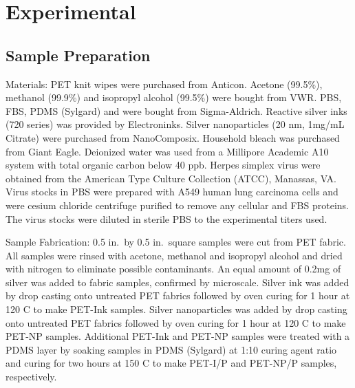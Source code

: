 \documentclass[journal=jacsat,manuscript=article]{achemso}
\begin{document}

\section{Experimental}


\subsection{Sample Preparation}
Materials: PET knit wipes were purchased from Anticon. Acetone (99.5\%), methanol (99.9\%) and isopropyl alcohol (99.5\%) were bought from VWR.  PBS, FBS, PDMS (Sylgard) and were bought from Sigma-Aldrich. Reactive silver inks (720 series) was provided by Electroninks. Silver nanoparticles (20 nm, 1mg/mL Citrate) were purchased from NanoComposix. Household bleach was purchased from Giant Eagle. Deionized water was used from a Millipore Academic A10 system with total organic carbon below 40 ppb. Herpes simplex virus were obtained from the American Type Culture Collection (ATCC), Manassas, VA. Virus stocks in PBS were prepared with A549 human lung carcinoma cells and were cesium chloride centrifuge purified to remove any cellular and FBS proteins. The virus stocks were diluted in sterile PBS to the experimental titers used.

Sample Fabrication: 0.5 in.~by 0.5 in.~square samples were cut from PET fabric. All samples were rinsed with acetone, methanol and isopropyl alcohol and dried with nitrogen to eliminate possible contaminants. An equal amount of 0.2mg of silver was added to fabric samples, confirmed by microscale. Silver ink was added by drop casting onto untreated PET fabrics followed by oven curing for 1 hour at 120 \degree C to make PET-Ink samples. Silver nanoparticles was added by drop casting onto untreated PET fabrics followed by oven curing for 1 hour at 120 \degree C to make PET-NP samples. Additional PET-Ink and PET-NP samples were treated with a PDMS layer by soaking samples in PDMS (Sylgard) at 1:10 curing agent  ratio and curing for two hours at 150 \degree C to make PET-I/P and PET-NP/P samples, respectively. 
\end{document}

